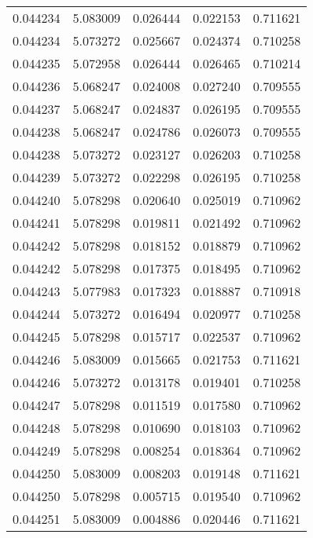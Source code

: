 \begin{tabular}{lrrrr}
0.044234    &  5.083009 &  0.026444 &  0.022153 &             0.711621 \\
0.044234    &  5.073272 &  0.025667 &  0.024374 &             0.710258 \\
0.044235    &  5.072958 &  0.026444 &  0.026465 &             0.710214 \\
0.044236    &  5.068247 &  0.024008 &  0.027240 &             0.709555 \\
0.044237    &  5.068247 &  0.024837 &  0.026195 &             0.709555 \\
0.044238    &  5.068247 &  0.024786 &  0.026073 &             0.709555 \\
0.044238    &  5.073272 &  0.023127 &  0.026203 &             0.710258 \\
0.044239    &  5.073272 &  0.022298 &  0.026195 &             0.710258 \\
0.044240    &  5.078298 &  0.020640 &  0.025019 &             0.710962 \\
0.044241    &  5.078298 &  0.019811 &  0.021492 &             0.710962 \\
0.044242    &  5.078298 &  0.018152 &  0.018879 &             0.710962 \\
0.044242    &  5.078298 &  0.017375 &  0.018495 &             0.710962 \\
0.044243    &  5.077983 &  0.017323 &  0.018887 &             0.710918 \\
0.044244    &  5.073272 &  0.016494 &  0.020977 &             0.710258 \\
0.044245    &  5.078298 &  0.015717 &  0.022537 &             0.710962 \\
0.044246    &  5.083009 &  0.015665 &  0.021753 &             0.711621 \\
0.044246    &  5.073272 &  0.013178 &  0.019401 &             0.710258 \\
0.044247    &  5.078298 &  0.011519 &  0.017580 &             0.710962 \\
0.044248    &  5.078298 &  0.010690 &  0.018103 &             0.710962 \\
0.044249    &  5.078298 &  0.008254 &  0.018364 &             0.710962 \\
0.044250    &  5.083009 &  0.008203 &  0.019148 &             0.711621 \\
0.044250    &  5.078298 &  0.005715 &  0.019540 &             0.710962 \\
0.044251    &  5.083009 &  0.004886 &  0.020446 &             0.711621 \\

\end{tabular}
